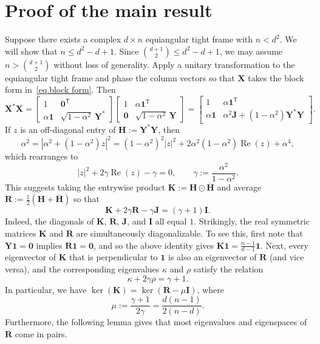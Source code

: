\documentclass{article}
\theoremstyle{plain}
\theoremstyle{definition}
\begin{document}
\section{Proof of the main result}

Suppose there exists a complex $d\times n$ equiangular tight frame with $n<d^2$.
We will show that $n\leq d^2-d+1$.
Since $\binom{d+1}{2}\leq d^2-d+1$, we may assume $n>\binom{d+1}{2}$ without loss of generality.
Apply a unitary transformation to the equiangular tight frame and phase the column vectors so that $\boldsymbol{X}$ takes the block form in~\eqref{eq.block form}.
Then
\[
\boldsymbol{X}^*\boldsymbol{X}
=\left[\begin{array}{cc}
1&\mathbf{0}^{\mathsf{T}}\\
\alpha\mathbf{1}&\sqrt{1-\alpha^2}\,\boldsymbol{Y}^*
\end{array}\right]
\left[\begin{array}{cc}
1&\alpha\mathbf{1}^{\mathsf{T}}\\
\mathbf{0}&\sqrt{1-\alpha^2}\,\boldsymbol{Y}
\end{array}\right]
=\left[\begin{array}{cc}
1&\alpha\mathbf{1}^{\mathsf{T}}\\
\alpha\mathbf{1}&\alpha^2\boldsymbol{J}+(1-\alpha^2)\boldsymbol{Y}^*\boldsymbol{Y}\end{array}\right].
\]
If $z$ is an off-diagonal entry of $\boldsymbol{H}:=\boldsymbol{Y}^*\boldsymbol{Y}$, then
\[
\alpha^2
=|\alpha^2+(1-\alpha^2)z|^2
=(1-\alpha^2)^2|z|^2+2\alpha^2(1-\alpha^2)\operatorname{Re}(z)+\alpha^4,
\]
which rearranges to
\[
|z|^2+2\gamma\operatorname{Re}(z)-\gamma=0,
\qquad
\gamma:=\frac{\alpha^2}{1-\alpha^2}.
\]
This suggests taking the entrywise product $\boldsymbol{K}:=\boldsymbol{H}\odot\overline{\boldsymbol{H}}$ and average $\boldsymbol{R}:=\frac{1}{2}(\boldsymbol{H}+\overline{\boldsymbol{H}})$ so that
\[
\boldsymbol{K}+2\gamma\boldsymbol{R}-\gamma\boldsymbol{J}
=(\gamma+1)\boldsymbol{I}.
\]
Indeed, the diagonals of $\boldsymbol{K}$, $\boldsymbol{R}$, $\boldsymbol{J}$, and $\boldsymbol{I}$ all equal $1$.
Strikingly, the real symmetric matrices $\boldsymbol{K}$ and $\boldsymbol{R}$ are simultaneously diagonalizable.
To see this, first note that $\boldsymbol{Y}\mathbf{1}=\mathbf{0}$ implies $\boldsymbol{R}\mathbf{1}
=\mathbf{0}$, and so the above identity gives $\boldsymbol{K}\mathbf{1}
=\frac{n-1}{d-1}\mathbf{1}$.
Next, every eigenvector of $\boldsymbol{K}$ that is perpendicular to $\mathbf{1}$ is also an eigenvector of $\boldsymbol{R}$ (and vice versa), and the corresponding eigenvalues $\kappa$ and $\rho$ satisfy the relation
\[
\kappa + 2\gamma\rho
=\gamma+1.
\]
In particular, we have $\operatorname{ker}(\boldsymbol{K})=\operatorname{ker}(\boldsymbol{R}-\mu\boldsymbol{I})$, where
\[
\mu
:=\frac{\gamma+1}{2\gamma}
=\frac{d(n-1)}{2(n-d)}.
\]
Furthermore, the following lemma gives that most eigenvalues and eigenspaces of $\boldsymbol{R}$ come in pairs.
\end{document}
